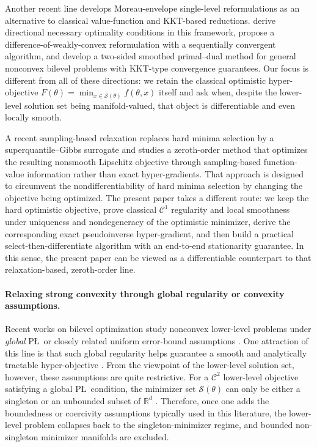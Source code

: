 \documentclass{article}
\theoremstyle{normaltheorem}
\newcommand{\R}{\mathbb{R}}
\newcommand{\calS}{\mathcal{S}}
\begin{document}
Another recent line develops Moreau-envelope single-level reformulations as an alternative to classical value-function and
KKT-based reductions. \citet{bai2025optimality} derive directional necessary optimality conditions in this framework,
\citet{gao2023moreau} propose a difference-of-weakly-convex reformulation with a sequentially convergent algorithm, and
\citet{Lu25tsp} develop a two-sided smoothed primal--dual method for general nonconvex bilevel problems with KKT-type
convergence guarantees. Our focus is different from all of these directions: we retain the classical optimistic
hyper-objective \(F(\theta)=\min_{x\in\calS(\theta)} f(\theta,x)\) itself and ask when, despite the lower-level solution set
being manifold-valued, that object is differentiable and even locally smooth.

A recent sampling-based relaxation \citep{masiha2025superquantile} replaces hard minima selection by a
superquantile--Gibbs surrogate and studies a zeroth-order method that optimizes the resulting nonsmooth Lipschitz
objective through sampling-based function-value information rather than exact hyper-gradients. That approach is designed
to circumvent the nondifferentiability of hard minima selection by changing the objective being optimized. The present
paper takes a different route: we keep the hard optimistic objective, prove classical \(\mathcal{C}^{1}\) regularity and
local smoothness under uniqueness and nondegeneracy of the optimistic minimizer, derive the corresponding exact
pseudoinverse hyper-gradient, and then build a practical select-then-differentiate algorithm with an end-to-end
stationarity guarantee. In this sense, the present paper can be viewed as a differentiable counterpart to that
relaxation-based, zeroth-order line.

\paragraph{Relaxing strong convexity through global regularity or convexity assumptions.}
Recent works on bilevel optimization study nonconvex lower-level problems under \emph{global} P\L\ or closely related
uniform error-bound assumptions
\citep{chen2023bilevel,kwon2023penalty,xiao2023generalized,huang2024optimal,shen2025penalty,liu2022bome}. One attraction
of this line is that such global regularity helps guarantee a smooth and analytically tractable hyper-objective
\citep{kwon2023penalty,chen2023bilevel}. From the viewpoint of the lower-level solution set, however, these assumptions are
quite restrictive. For a \(\mathcal{C}^{2}\) lower-level objective satisfying a global P\L\ condition, the minimizer set
\(\calS(\theta)\) can only be either a singleton or an unbounded subset of \(\R^d\)
\citep{criscitiello2025,masiha2025superquantile}. Therefore, once one adds the boundedness or coercivity assumptions
typically used in this literature, the lower-level problem collapses back to the singleton-minimizer regime, and bounded
non-singleton minimizer manifolds are excluded.
\end{document}
